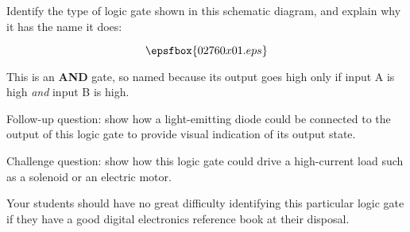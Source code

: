

Identify the type of logic gate shown in this schematic diagram, and explain why it has the name it does:

$$\epsfbox{02760x01.eps}$$







This is an {\bf AND} gate, so named because its output goes high only if input A is high {\it and} input B is high.

\vskip 10pt

Follow-up question: show how a light-emitting diode could be connected to the output of this logic gate to provide visual indication of its output state.

\vskip 10pt

Challenge question: show how this logic gate could drive a high-current load such as a solenoid or an electric motor.







Your students should have no great difficulty identifying this particular logic gate if they have a good digital electronics reference book at their disposal.




